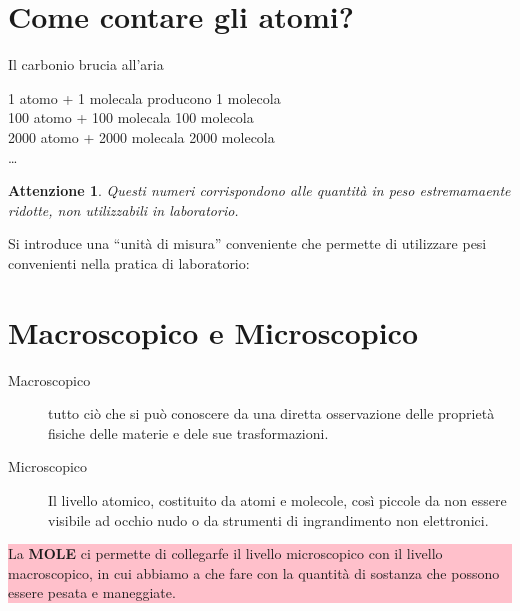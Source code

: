 \documentclass{book}
\newtheorem{att}{Attenzione}[section]
\begin{document}
\section{Come contare gli atomi?}
\label{sec:contatomi}

Il carbonio brucia all'aria 
\begin{center}
  {\color{red}1} atomo  + {\color{red}1} molecala  producono {\color{red}1} molecola \\ 
  {\color{red}100} atomo  + {\color{red}100} molecala  \textrightarrow{} {\color{red}100} molecola
  \\ 
  {\color{red}2000} atomo  + {\color{red}2000} molecala  \textrightarrow{} {\color{red}2000} molecola
  \\
  \dots
\end{center}
\begin{att}
  Questi numeri corrispondono alle quantità in peso estremamaente ridotte, non utilizzabili in laboratorio.
\end{att}
{\color{red} Si introduce una ``unità di misura'' conveniente che permette di utilizzare pesi convenienti nella
  pratica di laboratorio:}
\begin{center}
\end{center}

\section{Macroscopico e Microscopico}
\label{sec:macroemicro}

\begin{description}
\item[Macroscopico] tutto ciò che si può conoscere da una diretta osservazione delle proprietà fisiche delle materie
  e dele sue trasformazioni.
\item[Microscopico] Il livello atomico, costituito da atomi e molecole, così piccole da non essere visibile ad
  occhio nudo o da strumenti di ingrandimento non elettronici.
\end{description}
\colorbox{pink}
{
\begin{minipage}{.97\textwidth}
  La \textbf{MOLE} ci permette di collegarfe il livello microscopico con il livello macroscopico, in cui abbiamo a
  che fare con la quantità di sostanza che possono essere pesata e maneggiate.
\end{minipage}
}
\end{document}

